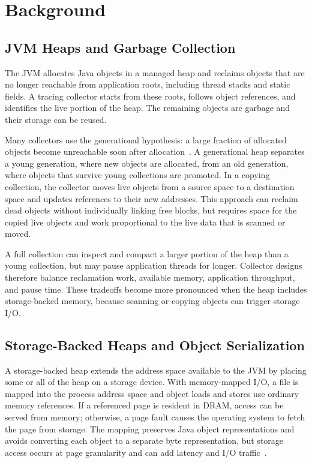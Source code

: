 
\chapter{Background}
\label{chapter:back}

\section{JVM Heaps and Garbage Collection}

The JVM allocates Java objects in a managed heap and reclaims objects that are no longer reachable from application roots, including thread stacks and static fields.
A tracing collector starts from these roots, follows object references, and identifies the live portion of the heap.
The remaining objects are garbage and their storage can be reused.

Many collectors use the generational hypothesis: a large fraction of allocated objects become unreachable soon after allocation~\cite{Ungar:1984:GSN}.
A generational heap separates a young generation, where new objects are allocated, from an old generation, where objects that survive young collections are promoted.
In a copying collection, the collector moves live objects from a source space to a destination space and updates references to their new addresses.
This approach can reclaim dead objects without individually linking free blocks, but requires space for the copied live objects and work proportional to the live data that is scanned or moved.

A full collection can inspect and compact a larger portion of the heap than a young collection, but may pause application threads for longer.
Collector designs therefore balance reclamation work, available memory, application throughput, and pause time.
These tradeoffs become more pronounced when the heap includes storage-backed memory, because scanning or copying objects can trigger storage I/O.

\section{Storage-Backed Heaps and Object Serialization}

A storage-backed heap extends the address space available to the JVM by placing some or all of the heap on a storage device.
With memory-mapped I/O, a file is mapped into the process address space and object loads and stores use ordinary memory references.
If a referenced page is resident in DRAM, access can be served from memory; otherwise, a page fault causes the operating system to fetch the page from storage.
The mapping preserves Java object representations and avoids converting each object to a separate byte representation, but storage access occurs at page granularity and can add latency and I/O traffic~\cite{flatflash, apapag:fmap}.

